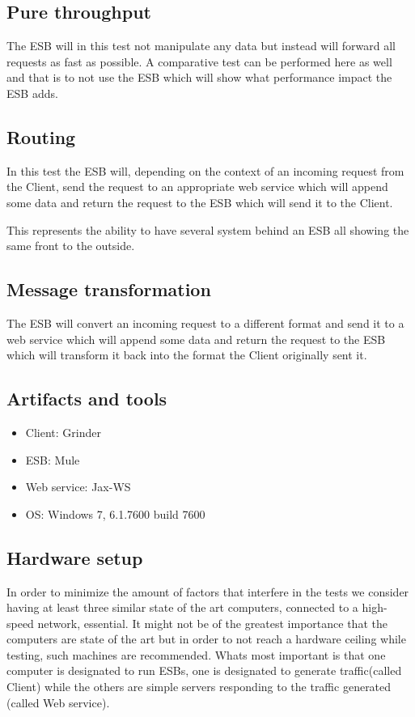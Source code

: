 
\subsection{Pure throughput}
The ESB will in this test not manipulate any data but instead will forward all requests as fast as possible. 
A comparative test can be performed here as well and that is to not use the ESB which will show what performance impact the ESB adds. 


\subsection{Routing}
In this test the ESB will, depending on the context of an incoming request from the Client, send the request to an appropriate web service which will append some data and return the request to the ESB which will send it to the Client.

This represents the ability to have several system behind an ESB all showing the same front to the outside.

\subsection{Message transformation}
The ESB will convert an incoming request to a different format and send it to a web service which will append some data and return the request to the ESB which will transform it back into the format the Client originally sent it.

\subsection{Artifacts and tools}
\begin{itemize}
	\item Client: Grinder \cite{grinder kod}
	\item ESB: Mule \cite{Mule kod}
	\item Web service: Jax-WS \cite{Jax-ws kod}
	\item OS: Windows 7, 6.1.7600 build 7600
\end{itemize}

\subsection{Hardware setup}
 In order to minimize the amount of factors that interfere in the tests we consider having at least three similar state of the art computers, connected to a high-speed network, essential.
It might not be of the greatest importance that the computers are state of the art but in order to not reach a hardware ceiling while testing, such machines are recommended. Whats most important is that one computer is designated to run ESBs, one is designated to generate traffic(called Client) while the others are simple servers responding to the traffic generated (called Web service). 



